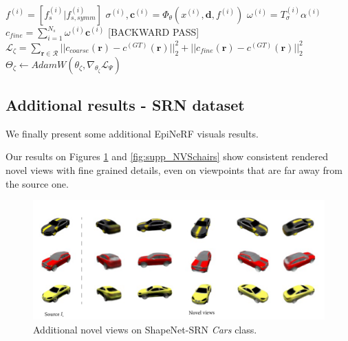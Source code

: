 \begin{algorithm}[htbp]
{{        $f^{(i)} = [f_{s}^{(i)} | f_{s,symm}^{(i)}]$
        $\sigma^{(i)},\mathbf{c}^{(i)} = \Phi_{\theta}(x^{(i)},\mathbf{d},f^{(i)})$ 
        $\omega^{(i)} = T_{\sigma}^{(i)}\alpha^{(i)}$ 
        }
        $c_{fine} = \sum_{i=1}^{N_{s}}\omega^{(i)}\textbf{c}^{(i)}$ 
  \;
  \textcolor{red!50}{[BACKWARD PASS]}\;
    $\mathcal{L}_{\zeta}= \sum_{\mathbf{r}\in\mathcal{R}} || c_{coarse}(\mathbf{r}) - c^{(GT)}(\mathbf{r}) ||_{2}^{2} +|| c_{fine}(\mathbf{r}) - c^{(GT)}(\mathbf{r}) ||_{2}^{2}$
    $\Theta_{\zeta} \gets AdamW(\theta_{\zeta},\nabla_{\theta_{\zeta}} \mathcal{L}_{\Psi})$ 
    }
\end{algorithm}
\newpage
\subsection{Additional results - SRN dataset }

We finally present some additional EpiNeRF visuals results. 

Our results on Figures \ref{fig:supp_NVScars} and \ref{fig:supp_NVSchairs} show consistent rendered novel views with fine grained details, even on viewpoints that are far away from the source one. 

\begin{figure}[htp!]
   \begin{center}
  \includegraphics[width=\linewidth]{images/epinerf/supp_NVS_Cars.png}
  \caption{Additional novel views on ShapeNet-SRN \textit{Cars} class. }
  \label{fig:supp_NVScars}
  \end{center}
\end{figure}


